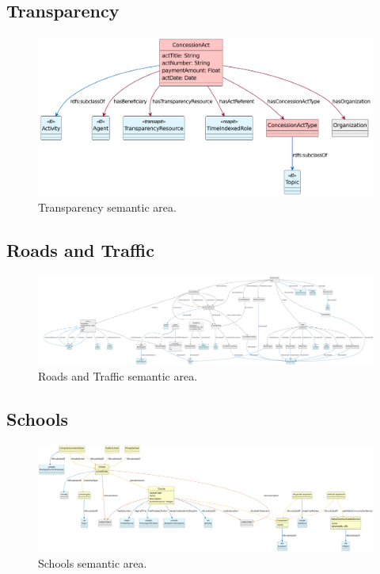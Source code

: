 \subsection{Transparency}
\label{subsec:transparency}

\begin{figure}[!ht]
  \centering
  \includegraphics[width=\columnwidth]{images/ontoim/transparency}
  \caption{Transparency semantic area.}
  \label{fig:transparency-sa}
\end{figure}

\subsection{Roads and Traffic}
\label{subsec:roads-traffic}

\begin{figure}
  \centering
  \includegraphics[width=\columnwidth]{images/ontoim/roads}
  \caption{Roads and Traffic semantic area.}
  \label{fig:roads-sa}
\end{figure}

\subsection{Schools}
\label{subsec:schools}

\begin{figure}
  \centering
  \includegraphics[width=\columnwidth]{images/ontoim/schools}
  \caption{Schools semantic area.}
  \label{fig:schools-sa}
\end{figure}

